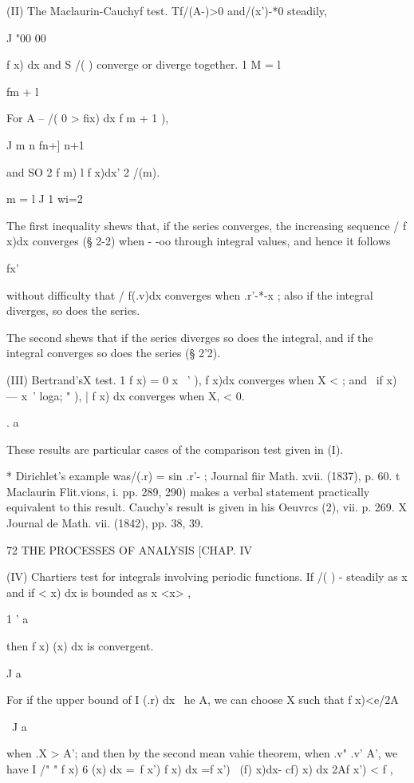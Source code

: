 (II) The Maclaurin-Cauchyf test. Tf/(A-)>0 and/(x')-*0 steadily, 

J "00 00 

f x) dx and S /( ) converge or diverge together. 
1 M = l 

fm + l 

For A -- /( 0 > fix) dx  f m + 1 ), 

J m 
n fn+] n+1 

and SO 2 f m) l f x)dx'  2 /(m). 

  m = l J 1 wi=2 

The first inequality shews that, if the series converges, the increasing sequence 
/ f x)dx converges (§ 2-2) when  - -oo through integral values, and hence it follows 

fx' 

without difficulty that / f(.v)dx converges when .r'-*-x ; also if the integral diverges, 
so does the series. 

The second shews that if the series diverges so does the integral, and if the integral 
converges so does the series (§ 2'2). 

(III) Bertrand'sX test. 1  f x) = 0 x ~' ), f x)dx converges when 
X < ; and \ if x) —  x~'   loga;  " ), | f x) dx converges when X, < 0. 

. a 

These results are particular cases of the comparison test given in (I). 

* Dirichlet's example was/(.r) = sin .r'- ; Journal fiir Math. xvii. (1837), p. 60. 
t Maclaurin  Flit.vions, i. pp. 289, 290) makes a verbal statement practically equivalent to this 
result. Cauchy's result is given in his Oeuvrcs (2), vii. p. 269. 
X Journal de Math. vii. (1842), pp. 38, 39. 



72 THE PROCESSES OF ANALYSIS [CHAP. IV 

(IV) Chartiers test  for integrals involving periodic functions. 
If /( ) -  steadily as     x and if <   x) dx is bounded as x <x> , 

1 ' a 

then f x)   (x) dx is convergent. 

J a 

For if the upper bound of I   (.r) dx \ he A, we can choose X such that f x)<e/2A 

\ J a 

when .X > A'; and then by the second mean vahie theorem, when .v" .v'   A', we have 
I /" " f x) 6 (x) dx =\ f  x') f  x) dx =f x') \ (f) x)dx- cf)  x) dx   2Af  x') < f , 

